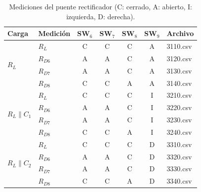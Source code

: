 \begin{table}[!t]
  \centering
  \footnotesize
  \caption{Mediciones del puente rectificador (C: cerrado, A: abierto, I: izquierda, D: derecha).}
  \label{tab:med_puente}
  \begin{tabular}{llccccl}
    \toprule
    \textbf{Carga} & \textbf{Medición} & \textbf{SW$_6$} & \textbf{SW$_7$} & \textbf{SW$_8$} & \textbf{SW$_9$} & \textbf{Archivo} \\ \midrule
    \multirow{4}{*}{$R_L$}               & $R_L$    & C & C & C & A & 3110.csv \\
                                         & $R_{D6}$ & A & A & C & A & 3120.csv \\
                                         & $R_{D7}$ & A & A & C & A & 3130.csv \\
                                         & $R_{D8}$ & C & C & A & A & 3140.csv \\ \midrule
    \multirow{4}{*}{$R_L \parallel C_1$} & $R_L$    & C & C & C & I & 3210.csv \\
                                         & $R_{D6}$ & A & A & C & I & 3220.csv \\
                                         & $R_{D7}$ & A & A & C & I & 3230.csv \\
                                         & $R_{D8}$ & C & C & A & I & 3240.csv \\ \midrule
    \multirow{4}{*}{$R_L \parallel C_2$} & $R_L$    & C & C & C & D & 3310.csv \\
                                         & $R_{D6}$ & A & A & C & D & 3320.csv \\
                                         & $R_{D7}$ & A & A & C & D & 3330.csv \\
                                         & $R_{D8}$ & C & C & A & D & 3340.csv \\ \bottomrule
  \end{tabular}
\end{table}
